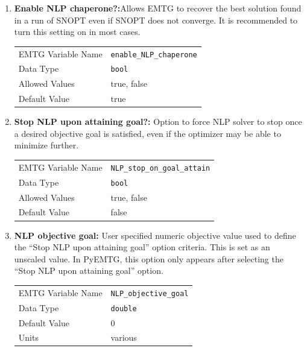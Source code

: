 \begin{enumerate}
    \item \textbf{Enable \ac{NLP} chaperone?:}{Allows \ac{EMTG} to recover the best solution found in a run of \ac{SNOPT} even if \ac{SNOPT} does not converge. It is recommended to turn this setting on in most cases.}
        \begin{table}[H]
            \hspace{2cm}
            \begin{tabular}{lp{5cm}}
            \ac{EMTG} Variable Name & \verb|enable_NLP_chaperone| \\
            Data Type & \verb|bool| \\
            Allowed Values & true, false \\
            Default Value & true \\
            \end{tabular}
        \end{table}

    \item \textbf{Stop \ac{NLP} upon attaining goal?:} Option to force \ac{NLP} solver to stop once a desired objective goal is satisfied, even if the optimizer may be able to minimize further.
        \begin{table}[H]
            \hspace{2cm}
            \begin{tabular}{lp{5cm}}
            \ac{EMTG} Variable Name & \verb|NLP_stop_on_goal_attain| \\
            Data Type & \verb|bool| \\
            Allowed Values & true, false \\
            Default Value & false \\
            \end{tabular}
        \end{table}

    \item \textbf{\ac{NLP} objective goal:} User specified numeric objective value used to define the ``Stop \ac{NLP} upon attaining goal'' option criteria. This is set as an unscaled value. In PyEMTG, this option only appears after selecting the ``Stop \ac{NLP} upon attaining goal'' option.
        \begin{table}[H]
            \hspace{2cm}
            \begin{tabular}{lp{5cm}}
            \ac{EMTG} Variable Name & \verb|NLP_objective_goal| \\
            Data Type & \verb|double| \\
            Default Value & 0 \\
            Units & various
            \end{tabular}
        \end{table}


\end{enumerate}

